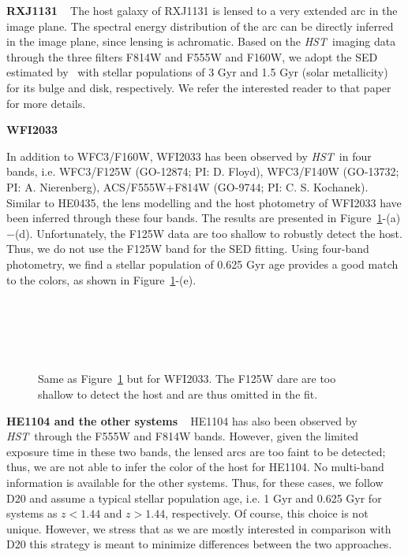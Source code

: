 \documentclass[fleqn,usenatbib]{mnras}
\newcommand{\hst}{{\it HST}}
\begin{document}
{\bf RXJ1131} ~ The host galaxy of RXJ1131 is lensed to a very extended arc in the image plane. The spectral energy distribution of the arc can be directly inferred in the image plane, since lensing is achromatic. Based on the \hst\ imaging data through the three filters F814W and F555W and F160W, we adopt the SED estimated by~\citet{Ding2017b} with stellar populations of 3 Gyr and 1.5 Gyr (solar metallicity) for its bulge and disk, respectively. We refer the interested reader to that paper for more details.

{\bf WFI2033} ~ 
{\color{blue}
In addition to WFC3/F160W, WFI2033 has been observed by \hst\ in  four bands, i.e. WFC3/F125W (GO-12874; PI: D. Floyd), WFC3/F140W (GO-13732; PI: A. Nierenberg), ACS/F555W+F814W  (GO-9744; PI: C. S. Kochanek). Similar to HE0435, the lens modelling and the host photometry of WFI2033 have been inferred through these four bands. The results are presented in Figure~\ref{fig:app_WFI2033}-(a)$-$(d). Unfortunately, the  F125W data are too shallow to robustly detect the host.  Thus, we do not use the F125W band for the SED fitting. Using four-band photometry, we find a stellar population of 0.625 Gyr age provides a good match to the colors, as shown in Figure~\ref{fig:app_WFI2033}-(e).
\begin{figure}
\centering
{}\\
\\
\\
\\
\caption{\label{fig:app_WFI2033} 
Same as Figure~\ref{fig:app_WFI2033} but for WFI2033. The F125W dare are too shallow to detect the host and are thus omitted in the fit.}
\end{figure} 
}

{\bf HE1104 and the other systems} ~ HE1104 has also been observed by \hst\ through the F555W and F814W bands. However, given the limited exposure time in these two bands, the lensed arcs are too faint to be detected; thus, we are not able to infer the color of the host for HE1104. No multi-band information is available for the other systems. Thus, for these cases, we follow D20 and assume a typical stellar population age, i.e. 1 Gyr and 0.625 Gyr for systems as $z<1.44$ and $z>1.44$, respectively. Of course, this choice is not unique. However, we stress that as we are mostly interested in comparison with D20 this strategy is meant to minimize differences between the two approaches.
\end{document}
